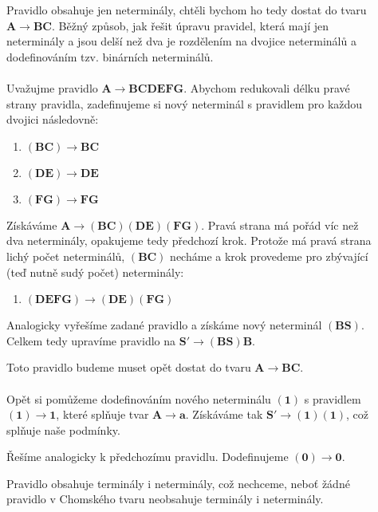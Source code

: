 \documentclass{report}
\begin{document}
\begin{description}
    \item[] Pravidlo obsahuje jen neterminály, chtěli bychom ho tedy dostat do tvaru $\mathbf{A \rightarrow BC}$. Běžný způsob, jak řešit úpravu pravidel, která mají jen neterminály a jsou delší než dva je rozdělením na dvojice neterminálů a dodefinováním tzv. binárních neterminálů.\\ \\
    Uvažujme pravidlo $\mathbf{A \rightarrow BCDEFG}$. Abychom redukovali délku pravé strany pravidla, zadefinujeme si nový neterminál s pravidlem pro každou dvojici následovně:
    \begin{enumerate}
        \item[]$\mathbf{(BC) \rightarrow BC}$
        \item[]$\mathbf{(DE) \rightarrow DE}$
        \item[]$\mathbf{(FG) \rightarrow FG}$
    \end{enumerate}
        Získáváme $\mathbf{A \rightarrow (BC)(DE)(FG)}$. Pravá strana má pořád víc než dva neterminály, opakujeme tedy předchozí krok. Protože má pravá strana lichý počet neterminálů, $\mathbf{(BC)}$ necháme a krok provedeme pro zbývající (teď nutně sudý počet) neterminály:
    \begin{enumerate}
        \item[]$\mathbf{(DEFG) \rightarrow (DE)(FG)}$
    \end{enumerate}
    Analogicky vyřešíme zadané pravidlo a získáme nový neterminál $\mathbf{(BS)}$. Celkem tedy upravíme pravidlo na $\mathbf{S' \rightarrow (BS)B}$.
    \item[] Toto pravidlo budeme muset opět dostat do tvaru $\mathbf{A \rightarrow BC}$.\\ \\
    Opět si pomůžeme dodefinováním nového neterminálu $\mathbf{(1)}$ s pravidlem $\mathbf{(1) \rightarrow 1}$, které splňuje tvar $\mathbf{A \rightarrow a}$. Získáváme tak $\mathbf{S' \rightarrow (1)(1)}$, což splňuje naše podmínky.
    \item[] Řešíme analogicky k předchozímu pravidlu. Dodefinujeme  $\mathbf{(0) \rightarrow 0}$.
    \item[] Pravidlo obsahuje terminály i neterminály, což nechceme, neboť žádné pravidlo v Chomského tvaru neobsahuje terminály i neterminály.\\ \\ 

\end{description}
\end{document}
